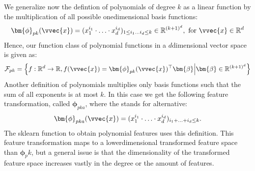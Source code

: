 \documentclass[letterpaper,10pt,english]{jupyterBook}
\begin{document}
\sphinxAtStartPar
We generalize now the defintion of polynomials of degree \(k\) as a linear function by the multiplication of all possible one\sphinxhyphen{}dimensional basis functions:
\begin{equation*}
\begin{split}\bm{\phi}_{pk}(\vvec{x}) = (x_1^{i_1}\cdot \ldots \cdot x_d^{i_d})_{1\leq i_1\ldots i_d\leq k} \in\mathbb{R}^{(k+1)^d}, \text{ for }\vvec{x}\in\mathbb{R}^d\end{split}
\end{equation*}
Hence, our function class of polynomial functions in a \(d\)\sphinxhyphen{}dimensional vector space is given as:
\begin{equation*}
\begin{split}\mathcal{F}_{pk}=\left\{f:\mathbb{R}^d\rightarrow \mathbb{R},f(\vvec{x})=\bm{\phi}_{pk}(\vvec{x})^\top \bm{\beta} \middle\vert 
 \bm{\beta}\in\mathbb{R}^{(k+1)^d} 
\right\}
\end{split}
\end{equation*}
Another definition of polynomials multiplies only basis functions such that the sum of all exponents is at most \(k\). In this case we get the following feature transformation, called \(\bm{\phi}_{pka}\), where the  stands for alternative:
\begin{equation*}
\begin{split}\bm{\phi}_{pka}(\vvec{x}) = (x_1^{i_1}\cdot \ldots \cdot x_d^{i_d})_{i_1+\ldots +i_d\leq k}.\end{split}
\end{equation*}
The sklearn function to obtain polynomial features uses this definition. This feature transformation maps to a lower\sphinxhyphen{}dimensional transformed feature space than \(\bm{\phi}_pk\), but a general issue is that the dimensionality of the transformed feature space increases vastly in the degree or the amount of features.
\end{document}
